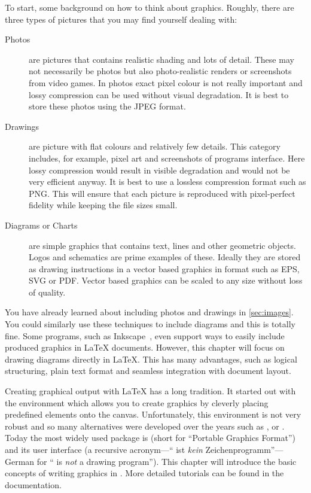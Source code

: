 To start, some background on how to think about graphics.
Roughly, there are three types of pictures that you may find yourself
dealing with:
\begin{description}
  \item[Photos] are pictures that contains realistic shading and lots of
    detail. These may not necessarily be photos but also photo-realistic
    renders or screenshots from video games. In photos exact pixel colour is
    not really important and lossy compression can be used without visual
    degradation. It is best to store these photos using the JPEG format.
  \item[Drawings] are picture with flat colours and relatively few details.
    This category includes, for example,  pixel art and screenshots of programs
    interface. Here lossy compression would result in visible degradation and
    would not be very efficient anyway. It is best to use a lossless compression
    format such as PNG\@. This will ensure that each picture is reproduced with
    pixel-perfect fidelity while keeping the file sizes small.
  \item[Diagrams or Charts] are simple graphics that contains text, lines and other
    geometric objects. Logos and schematics are prime examples of these.
    Ideally they are stored as drawing instructions in a vector based graphics in format such
    as EPS, SVG or PDF\@. Vector based graphics can be scaled to any size without loss of quality.
\end{description}

You have already learned about including photos and drawings in
\autoref{sec:images}. You could similarly use these techniques to include
diagrams and this is totally fine. Some programs, such as
Inkscape~\cite{inkscape}, even support ways to easily include produced graphics
in \LaTeX{} documents. However, this chapter will focus on drawing diagrams
directly in \LaTeX{}. This has many advantages, such as logical structuring,
plain text format and seamless integration with document layout.

Creating graphical output with \LaTeX{} has a long tradition. It started out
with the  environment which allows you to create graphics by
cleverly placing predefined elements onto the canvas. Unfortunately, this
environment is not very robust and so many alternatives were developed over the
years such as ,  or . Today the most
widely used package is  (short for \enquote{Portable Graphics
  Format}) and its user interface \TikZ{} (a recursive acronym---\enquote{\TikZ{}
  ist \textit{kein} Zeichenprogramm}---German for \enquote{\TikZ{} is
  \textit{not} a drawing program}). This chapter will introduce the basic
concepts of writing graphics in \TikZ{}. More detailed tutorials can be found
in the  documentation.


